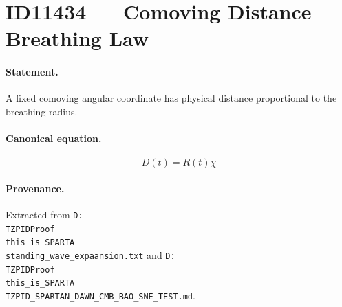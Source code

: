 \section*{ID11434 --- Comoving Distance Breathing Law}

\paragraph{Statement.}
A fixed comoving angular coordinate has physical distance proportional to the breathing radius.

\paragraph{Canonical equation.}
\[
D(t)=R(t)\chi
\]

\paragraph{Provenance.}
Extracted from \texttt{D:\\TZPIDProof\\this\_is\_SPARTA\\standing\_wave\_expaansion.txt} and \texttt{D:\\TZPIDProof\\this\_is\_SPARTA\\TZPID\_SPARTAN\_DAWN\_CMB\_BAO\_SNE\_TEST.md}.
